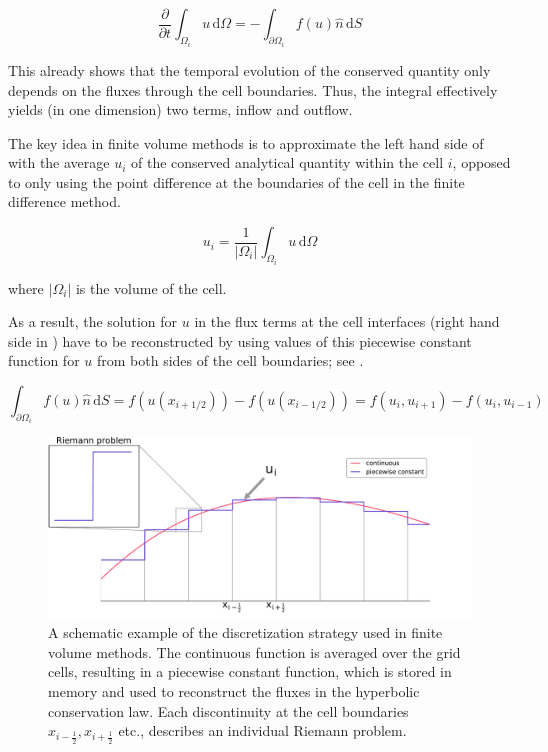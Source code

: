 \begin{equation}
  \frac{\partial}{\partial t}\int_{\Omega_{i}}u\,\mathrm{d}\Omega = - \int_{\partial\Omega_{i}}f(u)\hat{n}\,\mathrm{d}S
\label{eq:Finite_volume}
\end{equation}

This already shows that the temporal evolution of the conserved quantity only depends on the fluxes through the cell boundaries.
Thus, the integral effectively yields (in one dimension) two terms, inflow and outflow.

The key idea in finite volume methods is to approximate the left hand side of  with the average $u_{i}$ of the conserved analytical quantity within the cell $i$, opposed to only using the point difference at the boundaries of the cell in the finite difference method.

\begin{equation}
  u_{i} = \frac{1}{\vert\Omega_{i}\vert}\int_{\Omega_{i}}u\,\mathrm{d}\Omega
\label{eq:lhs}
\end{equation}

where $\vert\Omega_{i}\vert$ is the volume of the cell.

As a result, the solution for $u$ in the flux terms at the cell interfaces (right hand side in ) have to be reconstructed by using values of this piecewise constant function for $u$ from both sides of the cell boundaries; see .

\begin{equation}
  \int_{\partial\Omega_{i}}f(u)\hat{n}\,\mathrm{d}S = f(u(x_{i+1/2})) - f(u(x_{i-1/2})) = f(u_{i}, u_{i+1}) - f(u_{i}, u_{i-1})
\label{eq:rhs}
\end{equation}

\begin{figure}[ht]
 \centering
 \includegraphics[width=\textwidth]{Figures/piecewise_u}
 \captionsetup{justification=justified,singlelinecheck=false,width=\linewidth}
 \decoRule
 \caption[Piecewise constant function]{A schematic example of the discretization strategy used in finite volume methods.
                                       The continuous function is averaged over the grid cells, resulting in a piecewise constant function, which is stored in memory and used to reconstruct the fluxes in the hyperbolic conservation law.
                                       Each discontinuity at the cell boundaries $x_{i-\frac{1}{2}}, x_{i+\frac{1}{2}}$ etc., describes an individual Riemann problem.}
 \label{fig:Piecewise}
\end{figure}

